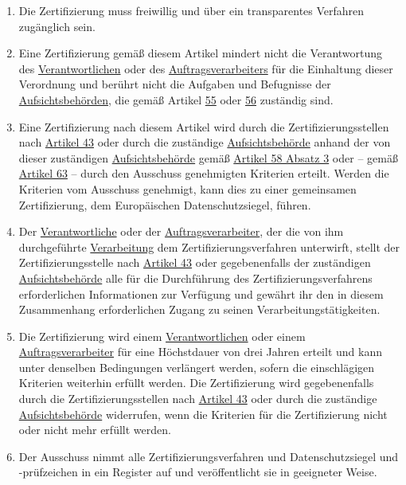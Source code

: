 \begin{enumerate}
  \item Die Zertifizierung muss freiwillig und über ein transparentes Verfahren zugänglich sein.%
  \label{itm:42-3}

  \item Eine Zertifizierung gemäß diesem Artikel mindert nicht die Verantwortung des \hyperref[itm:04-7]
   {Verantwortlichen} oder des
   \hyperref[itm:04-8]{Auftragsverarbeiters} für die Einhaltung dieser Verordnung und berührt nicht die Aufgaben und
    Befugnisse der
   \hyperref[itm:04-21]{Aufsichtsbehörden}, die gemäß Artikel \hyperref[ch:55]{55} oder \hyperref[ch:56]{56} zuständig
    sind.%
  \label{itm:42-4}

  \item Eine Zertifizierung nach diesem Artikel wird durch die Zertifizierungsstellen nach \hyperref[ch:43]{Artikel 43}
   oder durch die zuständige \hyperref[itm:04-21]{Aufsichtsbehörde} anhand der von dieser zuständigen \hyperref
   [itm:04-21]{Aufsichtsbehörde} gemäß \hyperref[itm:58-3]{Artikel 58 Absatz 3} oder -- gemäß \hyperref[ch:63]
   {Artikel 63} -- durch den Ausschuss genehmigten Kriterien erteilt. Werden die Kriterien vom Ausschuss genehmigt,
   kann dies zu einer gemeinsamen Zertifizierung, dem Europäischen Datenschutzsiegel, führen.%
  \label{itm:42-5}

  \item Der \hyperref[itm:04-7]{Verantwortliche} oder der \hyperref[itm:04-8]{Auftragsverarbeiter}, der die von ihm
   durchgeführte \hyperref[itm:04-2]{Verarbeitung} dem Zertifizierungsverfahren unterwirft, stellt der
   Zertifizierungsstelle nach \hyperref[ch:43]{Artikel 43} oder gegebenenfalls der zuständigen \hyperref[itm:04-21]
   {Aufsichtsbehörde} alle für die Durchführung des Zertifizierungsverfahrens erforderlichen Informationen zur
   Verfügung und gewährt ihr den in diesem Zusammenhang erforderlichen Zugang zu seinen Verarbeitungstätigkeiten.%
  \label{itm:42-6}

  \item Die Zertifizierung wird einem \hyperref[itm:04-7]{Verantwortlichen} oder einem \hyperref[itm:04-8]
   {Auftragsverarbeiter} für eine Höchstdauer von drei Jahren erteilt und kann unter denselben Bedingungen verlängert
   werden, sofern die einschlägigen Kriterien weiterhin erfüllt werden. Die Zertifizierung wird gegebenenfalls
   durch die Zertifizierungsstellen nach \hyperref[ch:43]{Artikel 43} oder durch die zuständige \hyperref[itm:04-21]
   {Aufsichtsbehörde} widerrufen, wenn die Kriterien für die Zertifizierung nicht oder nicht mehr erfüllt
   werden.%
  \label{itm:42-7}

  \item Der Ausschuss nimmt alle Zertifizierungsverfahren und Datenschutzsiegel und -prüfzeichen in ein Register auf und
   veröffentlicht sie in geeigneter Weise.%
  \label{itm:42-8}

\end{enumerate}


